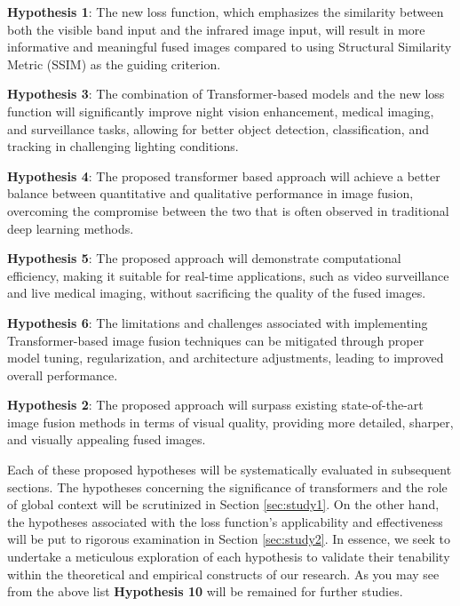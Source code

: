 \begin{list}{}{}
    \item \textbf{Hypothesis 1}: The new loss function, which emphasizes the similarity between both the visible band input and the infrared image input, will result in more informative and meaningful fused images compared to using Structural Similarity Metric (SSIM) as the guiding criterion.

    \item \textbf{Hypothesis 3}: The combination of Transformer-based models and the new loss function will significantly improve night vision enhancement, medical imaging, and surveillance tasks, allowing for better object detection, classification, and tracking in challenging lighting conditions.
    
    \item \textbf{Hypothesis 4}: The proposed transformer based approach will achieve a better balance between quantitative and qualitative performance in image fusion, overcoming the compromise between the two that is often observed in traditional deep learning methods.
    
    \item \textbf{Hypothesis 5}: The proposed approach will demonstrate computational efficiency, making it suitable for real-time applications, such as video surveillance and live medical imaging, without sacrificing the quality of the fused images.
    
    \item \textbf{Hypothesis 6}: The limitations and challenges associated with implementing Transformer-based image fusion techniques can be mitigated through proper model tuning, regularization, and architecture adjustments, leading to improved overall performance.
    
    \item \textbf{Hypothesis 2}: The proposed approach will surpass existing state-of-the-art image fusion methods in terms of visual quality, providing more detailed, sharper, and visually appealing fused images.
    
\end{list}

Each of these proposed hypotheses will be systematically evaluated in subsequent sections. The hypotheses concerning the significance of transformers and the role of global context will be scrutinized in Section \ref{sec:study1}. On the other hand, the hypotheses associated with the loss function's applicability and effectiveness will be put to rigorous examination in Section \ref{sec:study2}. In essence, we seek to undertake a meticulous exploration of each hypothesis to validate their tenability within the theoretical and empirical constructs of our research. As you may see from the above list \textbf{Hypothesis 10} will be remained for further studies.

